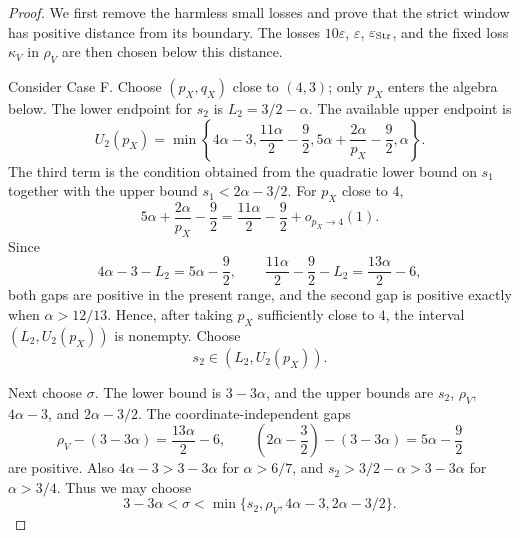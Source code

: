 \documentclass[10pt]{amsart}
\numberwithin{equation}{section}
\theoremstyle{plain}
\theoremstyle{definition}
\theoremstyle{remark}
\newcommand{\eps}{\varepsilon}
\begin{document}
\begin{proof}
We first remove the harmless small losses and prove that the strict window has positive distance from its boundary.  The losses $10\eps$, $\eps$, $\eps_{\rm Str}$, and the fixed loss $\kappa_V$ in \(\rho_V\) are then chosen below this distance.

Consider Case F.  Choose $(p_X,q_X)$ close to $(4,3)$; only $p_X$ enters the algebra below.  The lower endpoint for $s_2$ is $L_2=3/2-\alpha$.  The available upper endpoint is
\[
        U_2(p_X)=\min\left\{4\alpha-3,
        \frac{11\alpha}{2}-\frac92,
        5\alpha+\frac{2\alpha}{p_X}-\frac92,
        \alpha\right\}.
\]
The third term is the condition obtained from the quadratic lower bound on $s_1$ together with the upper bound $s_1<2\alpha-3/2$.  For $p_X$ close to $4$,
\[
        5\alpha+\frac{2\alpha}{p_X}-\frac92
        =\frac{11\alpha}{2}-\frac92+o_{p_X\to4}(1).
\]
Since
\[
        4\alpha-3-L_2=5\alpha-\frac92,
        \qquad
        \frac{11\alpha}{2}-\frac92-L_2=\frac{13\alpha}{2}-6,
\]
both gaps are positive in the present range, and the second gap is positive exactly when $\alpha>12/13$.  Hence, after taking $p_X$ sufficiently close to $4$, the interval $(L_2,U_2(p_X))$ is nonempty.  Choose
\begin{equation}\label{eq:parameter-proof-s2-choice}
        s_2\in(L_2,U_2(p_X)).
\end{equation}

Next choose $\sigma$.  The lower bound is $3-3\alpha$, and the upper bounds are $s_2$, $\rho_V$, $4\alpha-3$, and $2\alpha-3/2$.  The coordinate-independent gaps
\[
        \rho_V-(3-3\alpha)=\frac{13\alpha}{2}-6,
        \qquad
        \left(2\alpha-\frac32\right)-(3-3\alpha)=5\alpha-\frac92
\]
are positive.  Also $4\alpha-3>3-3\alpha$ for $\alpha>6/7$, and $s_2>3/2-\alpha>3-3\alpha$ for $\alpha>3/4$.  Thus we may choose
\begin{equation}\label{eq:parameter-proof-sigma-choice}
        3-3\alpha<\sigma<\min\{s_2,\rho_V,4\alpha-3,2\alpha-3/2\}.
\end{equation}


\end{proof}
\end{document}
